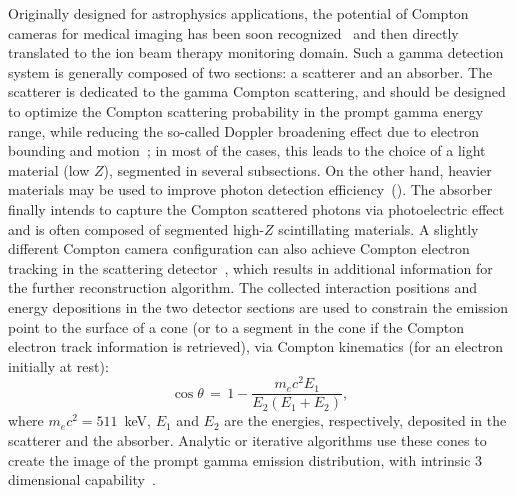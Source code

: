 Originally designed for astrophysics applications, the potential of Compton cameras for medical imaging has been soon recognized~\cite{TODD:1974aa} and then directly translated to the ion beam therapy monitoring domain. Such a gamma detection system is generally  composed of two sections: a scatterer and an absorber. The scatterer is dedicated to the gamma Compton scattering, and should be designed to optimize the Compton scattering probability in the prompt gamma energy range, while reducing the so-called Doppler broadening effect due to electron bounding and motion~\cite{Doppler}; in most of the cases, this leads to the choice of a light material (low $Z$), segmented in several subsections. On the other hand, heavier materials may be used to improve photon detection efficiency~(\cite{Solevi:2016aa, ALDAWOOD2017190, 0031-9155-60-18-7085}). The absorber finally intends to capture the Compton scattered photons via photoelectric effect and is often composed of segmented high-$Z$ scintillating materials. A slightly different Compton camera configuration can also achieve Compton electron tracking in the scattering detector~\cite{Frandes_2010, Yoshihara_ETCC}, which results in additional information for the further reconstruction algorithm.
 The collected interaction positions and energy depositions in the two detector sections are used to constrain the emission point to the surface of a cone (or to a segment in the cone if the Compton electron track information is retrieved), via Compton kinematics (for an electron initially at rest):
\begin{equation}
\cos\theta\,=\,1-\frac{m_{e}c^{2}E_{1}}{E_{2}(E_{1}+E_{2})},
\label{Compton_equation}
\end{equation} 
where \(m_{e}c^{2} = 511\)~keV, \(E_{1}\) and \(E_{2}\) are the energies, respectively, deposited in the scatterer and the absorber. 
Analytic or iterative algorithms use these cones to create the image of the prompt gamma emission distribution, with intrinsic 3 dimensional capability~\cite{McKisson3D, Kuchment:2016uiw}. 


